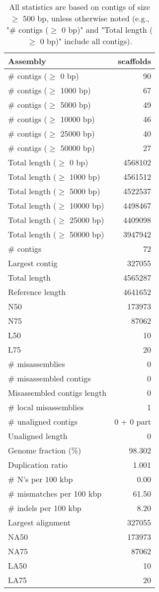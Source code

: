\documentclass[12pt,a4paper]{article}
\begin{document}
\begin{table}[ht]
\begin{center}
\caption{All statistics are based on contigs of size $\geq$ 500 bp, unless otherwise noted (e.g., "\# contigs ($\geq$ 0 bp)" and "Total length ($\geq$ 0 bp)" include all contigs).}
\begin{tabular}{|l*{1}{|r}|}
\hline
Assembly & scaffolds \\ \hline
\# contigs ($\geq$ 0 bp) & 90 \\ \hline
\# contigs ($\geq$ 1000 bp) & 67 \\ \hline
\# contigs ($\geq$ 5000 bp) & 49 \\ \hline
\# contigs ($\geq$ 10000 bp) & 46 \\ \hline
\# contigs ($\geq$ 25000 bp) & 40 \\ \hline
\# contigs ($\geq$ 50000 bp) & 27 \\ \hline
Total length ($\geq$ 0 bp) & 4568102 \\ \hline
Total length ($\geq$ 1000 bp) & 4561512 \\ \hline
Total length ($\geq$ 5000 bp) & 4522537 \\ \hline
Total length ($\geq$ 10000 bp) & 4498467 \\ \hline
Total length ($\geq$ 25000 bp) & 4409098 \\ \hline
Total length ($\geq$ 50000 bp) & 3947942 \\ \hline
\# contigs & 72 \\ \hline
Largest contig & 327055 \\ \hline
Total length & 4565287 \\ \hline
Reference length & 4641652 \\ \hline
N50 & 173973 \\ \hline
N75 & 87062 \\ \hline
L50 & 10 \\ \hline
L75 & 20 \\ \hline
\# misassemblies & 0 \\ \hline
\# misassembled contigs & 0 \\ \hline
Misassembled contigs length & 0 \\ \hline
\# local misassemblies & 1 \\ \hline
\# unaligned contigs & 0 + 0 part \\ \hline
Unaligned length & 0 \\ \hline
Genome fraction (\%) & 98.302 \\ \hline
Duplication ratio & 1.001 \\ \hline
\# N's per 100 kbp & 0.00 \\ \hline
\# mismatches per 100 kbp & 61.50 \\ \hline
\# indels per 100 kbp & 8.20 \\ \hline
Largest alignment & 327055 \\ \hline
NA50 & 173973 \\ \hline
NA75 & 87062 \\ \hline
LA50 & 10 \\ \hline
LA75 & 20 \\ \hline
\end{tabular}
\end{center}
\end{table}
\end{document}
